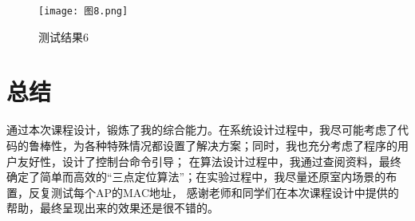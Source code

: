 \documentclass{article}
\begin{document}
\begin{figure}[ht] %
    
    \centering
    
    \texttt{[image: 图8.png]}
        
    \caption{测试结果6}
        
    \label{fig:h}
        
\end{figure}
    
\section{总结}

通过本次课程设计，锻炼了我的综合能力。在系统设计过程中，我尽可能考虑了代码的鲁棒性，为各种特殊情况都设置了解决方案；同时，我也充分考虑了程序的用户友好性，设计了控制台命令引导；
在算法设计过程中，我通过查阅资料，最终确定了简单而高效的“三点定位算法”；在实验过程中，我尽量还原室内场景的布置，反复测试每个AP的MAC地址，
感谢老师和同学们在本次课程设计中提供的帮助，最终呈现出来的效果还是很不错的。
\end{document}
